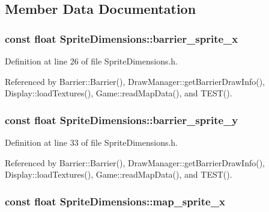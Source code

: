\subsection{Member Data Documentation}
\hypertarget{classSpriteDimensions_abcc491d376f31d36013e4f2396dbc408}{
\subsubsection[{barrier\-\_\-sprite\-\_\-x}]{\setlength{\rightskip}{0pt plus 5cm}const float Sprite\-Dimensions\-::barrier\-\_\-sprite\-\_\-x}}\label{classSpriteDimensions_abcc491d376f31d36013e4f2396dbc408}


Definition at line 26 of file Sprite\-Dimensions.\-h.



Referenced by Barrier\-::\-Barrier(), Draw\-Manager\-::get\-Barrier\-Draw\-Info(), Display\-::load\-Textures(), Game\-::read\-Map\-Data(), and T\-E\-S\-T().

\hypertarget{classSpriteDimensions_abad79766e2254e365d3455b3471a5d0a}{
\subsubsection[{barrier\-\_\-sprite\-\_\-y}]{\setlength{\rightskip}{0pt plus 5cm}const float Sprite\-Dimensions\-::barrier\-\_\-sprite\-\_\-y}}\label{classSpriteDimensions_abad79766e2254e365d3455b3471a5d0a}


Definition at line 33 of file Sprite\-Dimensions.\-h.



Referenced by Barrier\-::\-Barrier(), Draw\-Manager\-::get\-Barrier\-Draw\-Info(), Display\-::load\-Textures(), Game\-::read\-Map\-Data(), and T\-E\-S\-T().

\hypertarget{classSpriteDimensions_a69ff9ddd57b6fe4af120278bcece5439}{
\subsubsection[{map\-\_\-sprite\-\_\-x}]{\setlength{\rightskip}{0pt plus 5cm}const float Sprite\-Dimensions\-::map\-\_\-sprite\-\_\-x}}\label{classSpriteDimensions_a69ff9ddd57b6fe4af120278bcece5439}


